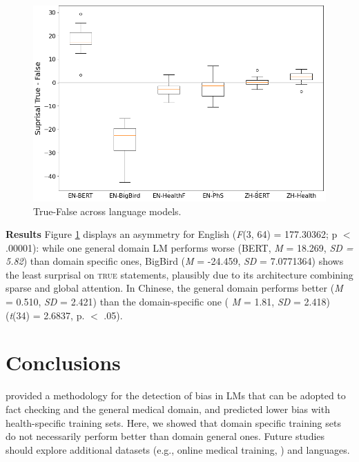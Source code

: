 \documentclass{IOS-Book-Article}
\begin{document}
\begin{figure}
    \centering
    \small
    \includegraphics[scale=0.37]{graphmatplot}
    \caption{True-False across language models. }
    \label{results}
\end{figure}

\noindent \textbf{Results} Figure \ref{results} displays an asymmetry for English (\textit{F}(3, 64) = 177.30362; p $<$ .00001): while one general domain LM performs worse (BERT, \textit{M} = 18.269, \textit{SD = 5.82}) than domain specific ones, BigBird (\textit{M} = -24.459, \textit{SD} = 7.0771364) shows the least surprisal on \textsc{true} statements, plausibly due to its architecture combining sparse and global attention. In Chinese, the general domain performs better (\textit{M} = 0.510, \textit{SD} = 2.421) than the domain-specific one ( \textit{M} = 1.81, \textit{SD} = 2.418) (\textit{t}(34) = 2.6837, p. $<$ .05).

\vspace{-4mm}
\section{Conclusions}
\cite{r1} provided a methodology for the detection of bias in LMs that can be adopted to fact checking and the general medical domain, and predicted lower bias with health-specific training sets. Here, we showed that domain specific training sets do not necessarily perform better than domain general ones. Future studies should explore additional datasets (e.g., online medical training, \cite{r4}) and languages.
\end{document}
